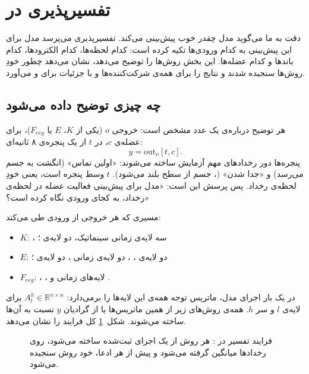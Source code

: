\FloatBarrier
\section{تفسیرپذیری در }
\label{sec:interp}

دقت به ما می‌گوید مدل چقدر خوب پیش‌بینی می‌کند. تفسیرپذیری می‌پرسد مدل برای این پیش‌بینی به کدام ورودی‌ها تکیه کرده است: کدام لحظه‌ها، کدام الکترودها، کدام باندها و کدام عضله‌ها. این بخش روش‌ها را توضیح می‌دهد، نشان می‌دهد چطور خودِ روش‌ها سنجیده شدند و نتایج را برای همه‌ی شرکت‌کننده‌ها و با جزئیات برای  و  می‌آورد.

\subsection{چه چیزی توضیح داده می‌شود}

هر توضیح درباره‌ی یک عدد مشخص است: خروجی $o$ (یکی از $K$، $E$ یا $F_{eeg}$)، برای عضله‌ی $c$، در  $t$ از یک پنجره‌ی ۸ ثانیه‌ای:
\begin{equation}
y=\mathrm{out}_o[t,c].
\end{equation}
پنجره‌ها دور رخدادهای مهم آزمایش ساخته می‌شوند: «اولین تماس» (انگشت به جسم می‌رسد) و «جدا شدن» (، جسم از سطح بلند می‌شود). $t$ وسط پنجره است، یعنی خودِ لحظه‌ی رخداد. پس پرسش این است: «مدل برای پیش‌بینی فعالیت عضله در لحظه‌ی رخداد، به کجای ورودی نگاه کرده است؟»

مسیری که هر خروجی از ورودی طی می‌کند:
\begin{itemize}
\item $K$: ، سه لایه‌ی زمانی سینماتیک، دو لایه‌ی ؛
\item $E$: دو لایه‌ی ، ، دو لایه‌ی زمانی ، دو لایه‌ی ؛
\item $F_{eeg}$: ، ، لایه‌های زمانی  و .
\end{itemize}
 در یک بار اجرای مدل، ماتریس توجه همه‌ی این لایه‌ها را برمی‌دارد: $A^{h}_{l}\in\mathbb{R}^{n\times n}$ برای لایه‌ی $l$ و سر $h$. همه‌ی روش‌های زیر از همین ماتریس‌ها یا از گرادیان $y$ نسبت به آن‌ها ساخته می‌شوند. شکل~\ref{fig:interp-pipeline} کل فرایند را نشان می‌دهد.

\begin{figure}[htbp]
\centering

\caption{فرایند تفسیر در : هر روش از یک اجرای ثبت‌شده ساخته می‌شود، روی رخدادها میانگین گرفته می‌شود و پیش از هر ادعا، خود روش سنجیده می‌شود.}
\label{fig:interp-pipeline}
\end{figure}

